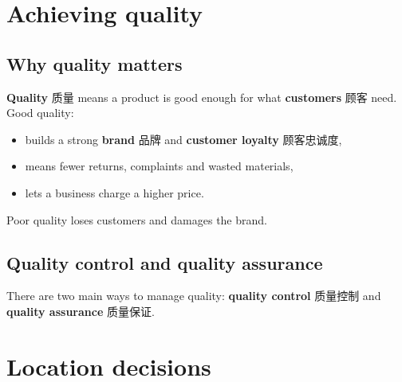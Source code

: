 \documentclass[11pt]{article}
\begin{document}
\section*{Achieving quality}

\subsection*{Why quality matters}

\textbf{Quality} 质量 means a product is good enough for what \textbf{customers} 顾客 need. Good quality:

\begin{itemize}
\item builds a strong \textbf{brand} 品牌 and \textbf{customer loyalty} 顾客忠诚度,

\item means fewer returns, complaints and wasted materials,

\item lets a business charge a higher price.

\end{itemize}

Poor quality loses customers and damages the brand.

\subsection*{Quality control and quality assurance}

There are two main ways to manage quality: \textbf{quality control} 质量控制 and \textbf{quality assurance} 质量保证.

\begin{center}
\end{center}

\section*{Location decisions}
\end{document}

